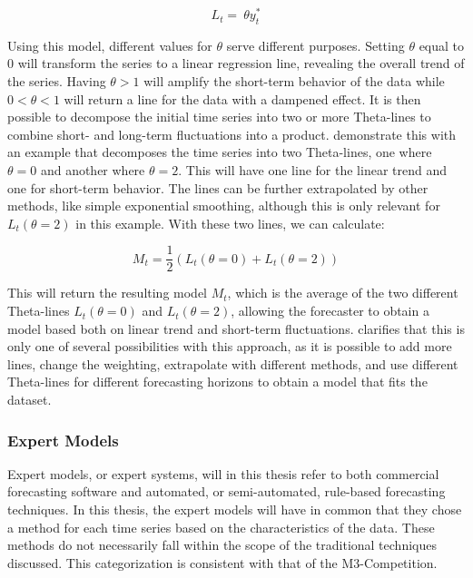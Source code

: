 \documentclass[12pt,a4paper]{article}
\begin{document}
\begin{equation}
  L_t=\ \theta y_t^\ast
  \label{theta}
\end{equation}

Using this model, different values for $\theta$ serve different purposes. Setting $\theta$ equal to 0 will transform the series to a linear regression line, revealing the overall trend of the series. Having $\theta>1$ will amplify the short-term behavior of the data while $0<\theta<1$ will return a line for the data with a dampened effect. It is then possible to decompose the initial time series into two or more Theta-lines to combine short- and long-term fluctuations into a product. \cite{ASSIMAKOPOULOS2000} demonstrate this with an example that decomposes the time series into two Theta-lines, one where $\theta=0$ and another where $\theta=2$. This will have one line for the linear trend and one for short-term behavior. The lines can be further extrapolated by other methods, like simple exponential smoothing, although this is only relevant for $L_t\left(\theta=2\right)$ in this example. With these two lines, we can calculate:

\begin{equation}
  M_t=\frac{1}{2}\left(L_t\left(\theta=0\right)+L_t\left(\theta=2\right)\right)
  \label{theta2}
\end{equation}

This will return the resulting model $M_t$, which is the average of the two different Theta-lines $L_t\left(\theta=0\right)$ and $L_t\left(\theta=2\right)$, allowing the forecaster to obtain a model based both on linear trend and short-term fluctuations. \cite{ASSIMAKOPOULOS2000} clarifies that this is only one of several possibilities with this approach, as it is possible to add more lines, change the weighting, extrapolate with different methods, and use different Theta-lines for different forecasting horizons to obtain a model that fits the dataset. 

\subsubsection{Expert Models}
Expert models, or expert systems, will in this thesis refer to both commercial forecasting software and automated, or semi-automated, rule-based forecasting techniques. In this thesis, the expert models will have in common that they chose a method for each time series based on the characteristics of the data. These methods do not necessarily fall within the scope of the traditional techniques discussed. This categorization is consistent with that of the M3-Competition. 
\end{document}
